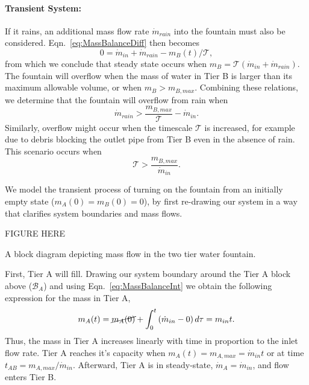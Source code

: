 \documentclass{article}
\begin{document}
\paragraph{Transient System:}
If it rains, an additional mass flow rate $\dot{m}_{rain}$ into the fountain must also be considered. Eqn.~\eqref{eq:MassBalanceDiff} then becomes
\begin{equation}
0 = \dot{m}_{in} + \dot{m}_{rain}-  m_B(t)/\mathcal{T},
\end{equation}
from which we conclude that steady state occurs when $m_B= \mathcal{T}(\dot{m}_{in}+\dot{m}_{rain})$. The fountain will overflow when the mass of water in Tier B is larger than its maximum allowable volume, or when $m_B > m_{B,max}$. Combining these relations, we determine that the fountain will overflow from rain when
\begin{equation}
\dot{m}_{rain} > \frac{m_{B,max}}{\mathcal{T}} -\dot{m}_{in}.
\end{equation}
Similarly, overflow might occur when the timescale $\mathcal{T}$ is increased, for example due to debris blocking the outlet pipe from Tier B even in the absence of rain. This scenario occurs when
\begin{equation}
\mathcal{T}>  \frac{m_{B,max}}{\dot{m}_{in}}.
\end{equation}

We model the transient process of turning on the fountain from an initially empty state ($m_A(0) = m_B(0) = 0$), by first re-drawing our system in a way that clarifies system boundaries and mass flows. 

\color{red} FIGURE HERE
\caption{A block diagram depicting mass flow in the two tier water fountain.}\label{fig:FountainSchematic}

First, Tier A will fill. Drawing our system boundary around the Tier A block above ($\mathcal{B}_A$) and using Eqn.~\eqref{eq:MassBalanceInt} we obtain the following expression for the mass in Tier A,
\begin{equation}
m_A(t) = \cancel{m_A(0)} + \int_0^t \left( \dot{m}_{in} - 0\right) d\tau = m_{in}t.
\end{equation}
Thus, the mass in Tier A increases linearly with time in proportion to the inlet flow rate. Tier A reaches it's capacity when $m_A(t) = m_{A,max} = \dot{m}_{in}t$ or at time $t_{AB}= m_{A,max}/\dot{m}_{in}$. Afterward, Tier A is in steady-state, $\dot{m}_A = \dot{m}_{in}$, and flow enters Tier B.
\end{document}
